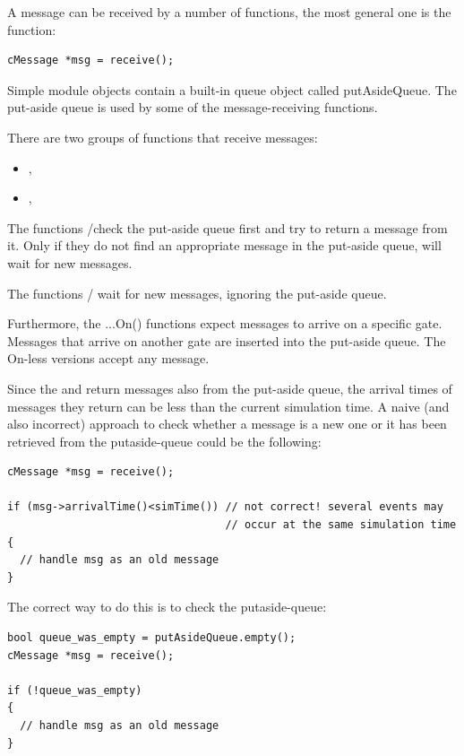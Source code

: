 A message can be received by a number of functions, the most 
general one is the  function:

\begin{Verbatim}
cMessage *msg = receive();
\end{Verbatim}

Simple module objects contain a built-in queue object called
putAsideQueue. The put-aside queue is used by
some of the message-receiving functions.

There are two groups of functions that receive messages:
\begin{itemize}
\item{, }
\item{, }
\end{itemize}

The functions /check the put-aside queue 
first and try to return a message from it. Only if they do not 
find an appropriate message in the put-aside queue, will wait 
for new messages.

The functions / wait for new messages, 
ignoring the put-aside queue.

Furthermore, the ...On() functions expect messages to arrive on a
specific gate. Messages that arrive on another gate are inserted into
the put-aside queue. The On-less versions accept any message.

Since the  and  return messages
also from the put-aside queue, the arrival times of messages they
return can be less than the current simulation time. A naive (and also
incorrect) approach to check whether a message is a new one or it has
been retrieved from the putaside-queue could be the following:

\begin{Verbatim}
cMessage *msg = receive();

if (msg->arrivalTime()<simTime()) // not correct! several events may
                                  // occur at the same simulation time
{
  // handle msg as an old message
}
\end{Verbatim}


The correct way to do this is to check the putaside-queue:

\begin{Verbatim}
bool queue_was_empty = putAsideQueue.empty();
cMessage *msg = receive();

if (!queue_was_empty) 
{
  // handle msg as an old message
}
\end{Verbatim}


